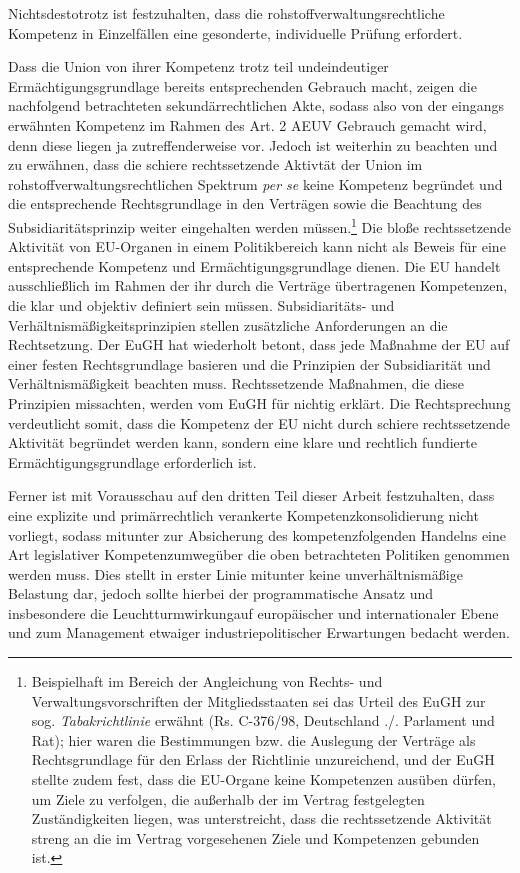 \documentclass[12pt,a4paper,oneside]{book} %
\begin{document}
	Nichtsdestotrotz ist festzuhalten, dass die rohstoffverwaltungsrechtliche Kompetenz in Einzelfällen eine gesonderte, individuelle Prüfung erfordert.
	
	Dass die Union von ihrer Kompetenz trotz teil undeindeutiger Ermächtigungsgrundlage bereits entsprechenden Gebrauch macht, zeigen die nachfolgend betrachteten sekundärrechtlichen Akte, sodass also von der eingangs erwähnten Kompetenz im Rahmen des Art. 2 AEUV Gebrauch gemacht wird, denn diese liegen ja zutreffenderweise vor. Jedoch ist weiterhin zu beachten und zu erwähnen, dass die schiere rechtssetzende Aktivtät der Union im rohstoffverwaltungsrechtlichen Spektrum \textit{per se} keine Kompetenz begründet und die entsprechende Rechtsgrundlage in den Verträgen sowie die Beachtung des Subsidiaritätsprinzip weiter eingehalten werden müssen.\footnote{Beispielhaft im Bereich der Angleichung von Rechts- und Verwaltungsvorschriften der Mitgliedsstaaten sei das Urteil des EuGH zur sog. \textit{Tabakrichtlinie} erwähnt (Rs. C-376/98, Deutschland ./. Parlament und Rat); hier waren die Bestimmungen bzw. die Auslegung der Verträge als Rechtsgrundlage für den Erlass der Richtlinie unzureichend, und der EuGH stellte zudem fest, dass die EU-Organe keine Kompetenzen ausüben dürfen, um Ziele zu verfolgen, die außerhalb der im Vertrag festgelegten Zuständigkeiten liegen, was unterstreicht, dass die rechtssetzende Aktivität streng an die im Vertrag vorgesehenen Ziele und Kompetenzen gebunden ist.} Die bloße rechtssetzende Aktivität von EU-Organen in einem Politikbereich kann nicht als Beweis für eine entsprechende Kompetenz und Ermächtigungsgrundlage dienen. Die EU handelt ausschließlich im Rahmen der ihr durch die Verträge übertragenen Kompetenzen, die klar und objektiv definiert sein müssen. Subsidiaritäts- und Verhältnismäßigkeitsprinzipien stellen zusätzliche Anforderungen an die Rechtsetzung. Der EuGH hat wiederholt betont, dass jede Maßnahme der EU auf einer festen Rechtsgrundlage basieren und die Prinzipien der Subsidiarität und Verhältnismäßigkeit beachten muss. Rechtssetzende Maßnahmen, die diese Prinzipien missachten, werden vom EuGH für nichtig erklärt. Die Rechtsprechung verdeutlicht somit, dass die Kompetenz der EU nicht durch schiere rechtssetzende Aktivität begründet werden kann, sondern eine klare und rechtlich fundierte Ermächtigungsgrundlage erforderlich ist.
	
	Ferner ist mit Vorausschau auf den dritten Teil dieser Arbeit festzuhalten, dass eine explizite und primärrechtlich verankerte Kompetenzkonsolidierung nicht vorliegt, sodass mitunter zur Absicherung des kompetenzfolgenden Handelns eine Art legislativer \glqq Kompetenzumweg\grqq über die oben betrachteten Politiken genommen werden muss. Dies stellt in erster Linie mitunter keine unverhältnismäßige Belastung dar, jedoch sollte hierbei der programmatische Ansatz und insbesondere die \glqq Leuchtturmwirkung\grqq auf europäischer und internationaler Ebene und zum Management etwaiger industriepolitischer Erwartungen bedacht werden.
	
\end{document}

